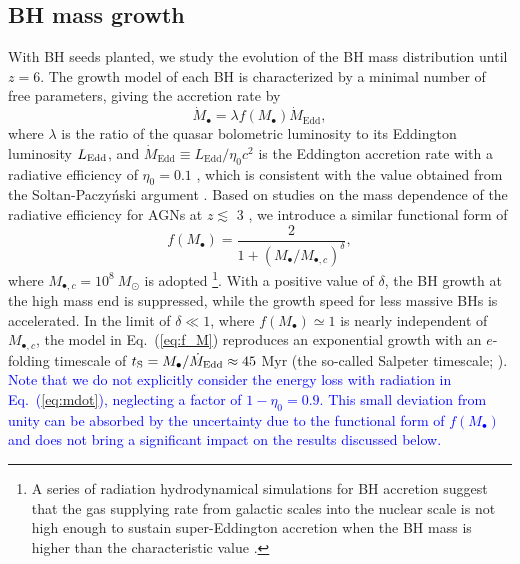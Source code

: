 \documentclass[twocolumn, twocolappendix]{aastex63}
\newcommand{\Msun}{M_\odot}
\newcommand{\Mbh}{M_\bullet}
\newcommand{\Mdot}{\dot{M}}
\newcommand{\blue}[1]{\textcolor{blue}{ #1}}
\begin{document}
\begin{CJK*}{UTF8}{gbsn}
\vspace{2mm}
\subsection{BH mass growth}
\label{sec:model}
With BH seeds planted, we study the evolution of the BH mass distribution until $z=6$. 
The growth model of each BH is characterized by a minimal number of free parameters, 
giving the accretion rate by
%
\begin{equation}
  \label{eq:mdot}
  \Mdot_\bullet = \lambda f(\Mbh) \Mdot_\mathrm{Edd} ,
\end{equation}
where $\lambda$ is the ratio of the quasar bolometric luminosity to its Eddington luminosity $L_{\rm Edd}$,
and $\Mdot_\mathrm{Edd} \equiv L_{\mathrm{Edd}}/\eta_0 c^2$ is the Eddington accretion rate with a radiative efficiency of $\eta_0=0.1$ \citep{1973A&A....24..337S},
which is consistent with the value obtained from the Soltan-Paczy{\'n}ski argument \citep[e.g.,][]{2002MNRAS.335..965Y,2010ApJ...725..388C}.
Based on studies on the mass dependence of the radiative efficiency for AGNs at $z\lesssim$ 3 
\citep{2008MNRAS.390..561C,2012ApJ...749..187L,2014ApJ...786..104U}, 
we introduce a similar functional form of
%
\begin{equation}
\label{eq:f_M}
f(\Mbh) = \frac{2}{1+\left(\Mbh /M_{\bullet,c} \right)^\delta}, 
\end{equation}
%
where $M_{\bullet,c}=10^8~\Msun$ is adopted
\footnote[3]{
A series of radiation hydrodynamical simulations for BH accretion
suggest that the gas supplying rate from galactic scales into the nuclear scale is not high enough to sustain 
super-Eddington accretion when the BH mass is higher than the characteristic value \citep{2021ApJ...907...74T}.}.
With a positive value of $\delta$, the BH growth at the high mass end is suppressed,
while the growth speed for less massive BHs is accelerated.
In the limit of $\delta \ll 1$, where $f(\Mbh) \simeq 1$ is nearly independent of $M_{\bullet,c}$,
the model in Eq.~(\ref{eq:f_M}) reproduces an exponential growth with an $e$-folding timescale of
$t_{\rm S} =  \Mbh/\Mdot_{\mathrm{Edd}} \approx 45$ Myr (the so-called Salpeter timescale; \citealt{1964ApJ...140..796S}).
\blue{
Note that we do not explicitly consider the energy loss with radiation in Eq.~(\ref{eq:mdot}), neglecting a factor of $1-\eta_0=0.9$.
This small deviation from unity can be absorbed by the uncertainty due to the functional form of $f(M_\bullet)$ and does not bring 
a significant impact on the results discussed below.
}





\end{CJK*}
\end{document}
